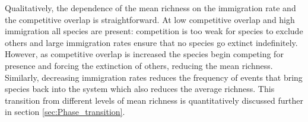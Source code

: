\documentclass[9pt,lineno]{elife}
\begin{document}
Qualitatively, the dependence of the mean richness on the immigration rate and the competitive overlap is straightforward.
At low competitive overlap and high immigration all species are present: competition is too weak for species to exclude others and large immigration rates ensure that no species go extinct indefinitely.
However, as competitive overlap is increased the species begin competing for presence and forcing the extinction of others, reducing the mean richness.
Similarly, decreasing immigration rates reduces the frequency of events that bring species back into the system which also reduces the average richness.
This transition from different levels of mean richness is quantitatively discussed further in section \ref{sec:Phase_transition}.




\end{document}
